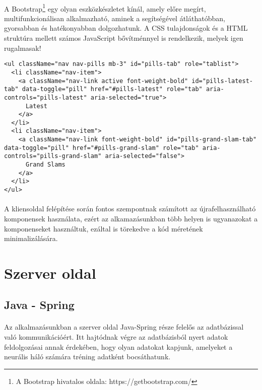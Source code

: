 \paragraph{}
A Bootstrap\footnote{A Bootstrap hivatalos oldala: https://getbootstrap.com/} egy olyan eszközkészletet kínál, amely előre megírt, multifunkcionálisan alkalmazható, aminek a segítségével átláthatóbban, gyorsabban és hatékonyabban dolgozhatunk. A CSS tulajdonságok és a HTML struktúra mellett számos JavaScript bővítménnyel is rendelkezik, melyek igen rugalmasak!

\begin{lstlisting}[caption=Responsive webtervezés - Bootstrap keretrendszer]
<ul className="nav nav-pills mb-3" id="pills-tab" role="tablist">
  <li className="nav-item">
    <a className="nav-link active font-weight-bold" id="pills-latest-tab" data-toggle="pill" href="#pills-latest" role="tab" aria-controls="pills-latest" aria-selected="true"> 
      Latest 
    </a>
  </li>
  <li className="nav-item">
    <a className="nav-link font-weight-bold" id="pills-grand-slam-tab" data-toggle="pill" href="#pills-grand-slam" role="tab" aria-controls="pills-grand-slam" aria-selected="false"> 
      Grand Slams 
    </a>
  </li>
</ul>
\end{lstlisting}

\paragraph{} A kliensoldal felépítése során fontos szempontnak számított az újrafelhasználható komponensek használata, ezért az alkamazásunkban több helyen is ugyanazokat a komponenseket használtuk, ezáltal is törekedve a kód méretének minimalizálására.

\section{Szerver oldal}
\subsection{Java - Spring}
\paragraph{}
Az alkalmazásunkban a szerver oldal Java-Spring része felelős az adatbázissal való kommunikációért. Itt hajtódnak végre az adatbázisból nyert adatok feldolgozásai annak érdekében, hogy olyan adatokat kapjunk, amelyeket a neurális háló számára tréning adatként bocsáthatunk.

